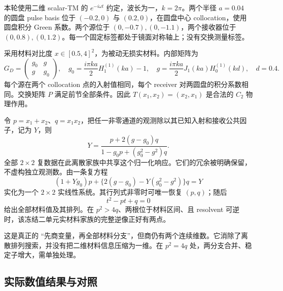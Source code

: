 本轮使用二维 scalar-TM 的 $e^{-i\omega t}$ 约定，波长为一，$k=2\pi$。两个半径 $a=0.04$ 的圆盘 pulse basis 位于 $(-0.2,0)$ 与 $(0.2,0)$，在圆盘中心 collocation，使用圆盘积分 Green 系数。两个源位于 $(0,-0.7),(0,-1.1)$，两个接收器位于 $(0,0.8),(0,1.2)$。每一个固定标签都处于镜面对称轴上；没有交换测量标签。

采用材料对比度 $x\in[0.5,4]^2$，为被动无损实材料。内部矩阵为
\begin{equation}
G_D=\begin{pmatrix}g_0&g\\g&g_0\end{pmatrix},\quad
g_0=\frac{i\pi ka}{2}H_1^{(1)}(ka)-1,\quad
g=\frac{i\pi ka}{2}J_1(ka)H_0^{(1)}(kd),\quad d=0.4.
\end{equation}
每个源在两个 collocation 点的入射值相同，每个 receiver 对两圆盘的积分系数相同。交换矩阵 $P$ 满足前节全部条件。因此 $T(x_1,x_2)=(x_2,x_1)$ 是合法的 $C_2$ 物理作用。

令 $p=x_1+x_2$、$q=x_1x_2$，把任一非零通道的观测除以其已知入射和接收公共因子，记为 $Y$，则
\begin{equation}
Y=\frac{p+2(g-g_0)q}{1-g_0p+(g_0^2-g^2)q}.\label{eq:2cell-rational}
\end{equation}
全部 $2\times2$ 复数据在此离散家族中共享这个归一化响应。它们的冗余被明确保留，不虚构独立观测数。由一条复方程
\begin{equation}
(1+Yg_0)p+\{2(g-g_0)-Y(g_0^2-g^2)\}q=Y\label{eq:2cell-linear}
\end{equation}
实化为一个 $2\times2$ 实线性系统。其行列式非零时可唯一恢复 $(p,q)$；随后
\begin{equation}
t^2-pt+q=0
\end{equation}
给出全部材料值及其排列。在 $p^2>4q$、两根位于材料区间、且 resolvent 可逆时，该冻结二单元实材料家族的完整逆像正好有两点。

这是真正的 ``先商变量，再全部材料分支''，但商仍有两个连续维数。它消除了离散排列搜索，并没有把二维材料信息压缩为一维。在 $p^2=4q$ 处，两分支合并、稳定子增大，需单独处理。

\subsection{实际数值结果与对照}

